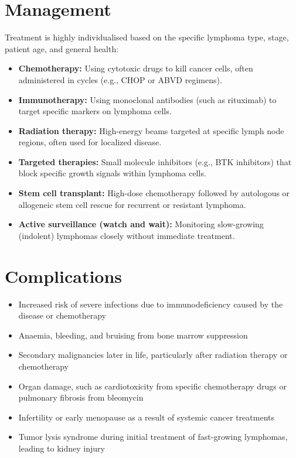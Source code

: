 \section*{Management}
Treatment is highly individualised based on the specific lymphoma type, stage, patient age, and general health:

\begin{itemize}
    \item \textbf{Chemotherapy:} Using cytotoxic drugs to kill cancer cells, often administered in cycles (e.g., CHOP or ABVD regimens).
    \item \textbf{Immunotherapy:} Using monoclonal antibodies (such as rituximab) to target specific markers on lymphoma cells.
    \item \textbf{Radiation therapy:} High-energy beams targeted at specific lymph node regions, often used for localized disease.
    \item \textbf{Targeted therapies:} Small molecule inhibitors (e.g., BTK inhibitors) that block specific growth signals within lymphoma cells.
    \item \textbf{Stem cell transplant:} High-dose chemotherapy followed by autologous or allogeneic stem cell rescue for recurrent or resistant lymphoma.
    \item \textbf{Active surveillance (watch and wait):} Monitoring slow-growing (indolent) lymphomas closely without immediate treatment.
\end{itemize}

\section*{Complications}
\begin{itemize}
    \item Increased risk of severe infections due to immunodeficiency caused by the disease or chemotherapy
    \item Anaemia, bleeding, and bruising from bone marrow suppression
    \item Secondary malignancies later in life, particularly after radiation therapy or chemotherapy
    \item Organ damage, such as cardiotoxicity from specific chemotherapy drugs or pulmonary fibrosis from bleomycin
    \item Infertility or early menopause as a result of systemic cancer treatments
    \item Tumor lysis syndrome during initial treatment of fast-growing lymphomas, leading to kidney injury
\end{itemize}

